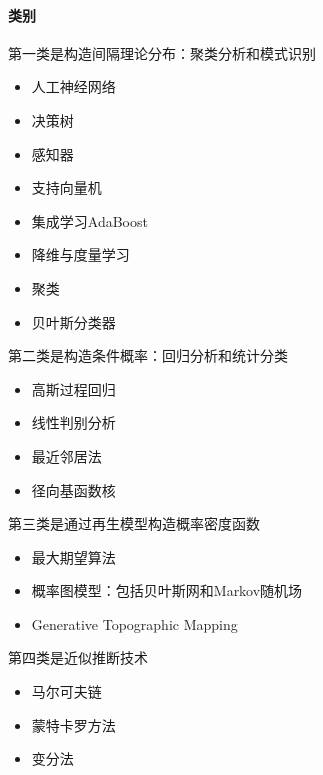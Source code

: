 \documentclass[letterpaper,10pt,english]{sphinxmanual}
\begin{document}
\paragraph{类别}
\label{\detokenize{chapter_AI_dive/ML:id7}}
第一类是构造间隔理论分布：聚类分析和模式识别
\begin{itemize}
\item {} 
人工神经网络

\item {} 
决策树

\item {} 
感知器

\item {} 
支持向量机

\item {} 
集成学习AdaBoost

\item {} 
降维与度量学习

\item {} 
聚类

\item {} 
贝叶斯分类器

\end{itemize}

第二类是构造条件概率：回归分析和统计分类
\begin{itemize}
\item {} 
高斯过程回归

\item {} 
线性判别分析

\item {} 
最近邻居法

\item {} 
径向基函数核

\end{itemize}

第三类是通过再生模型构造概率密度函数
\begin{itemize}
\item {} 
最大期望算法

\item {} 
概率图模型：包括贝叶斯网和Markov随机场

\item {} 
Generative Topographic Mapping

\end{itemize}

第四类是近似推断技术
\begin{itemize}
\item {} 
马尔可夫链

\item {} 
蒙特卡罗方法

\item {} 
变分法

\end{itemize}
\end{document}
